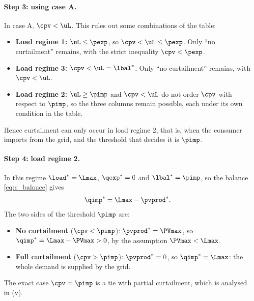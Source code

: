 \paragraph{Step 3: using case A.}
In case A, $\cpv < \uL$. This rules out some combinations of the table:
\begin{itemize}
    \item \textbf{Load regime 1:} $\uL \leq \pexp$, so $\cpv < \uL \leq \pexp$. Only ``no
    curtailment'' remains, with the strict inequality $\cpv < \pexp$.
    \item \textbf{Load regime 3:} $\cpv < \uL = {\lbal}^*$. Only ``no curtailment'' remains,
    with $\cpv < \uL$.
    \item \textbf{Load regime 2:} $\uL \geq \pimp$ and $\cpv < \uL$ do not order $\cpv$ with
    respect to $\pimp$, so the three columns remain possible, each under its own condition
    in the table.
\end{itemize}
Hence curtailment can only occur in load regime 2, that is, when the consumer imports from the
grid, and the threshold that decides it is $\pimp$.

\paragraph{Step 4: load regime 2.}
In this regime ${\load}^* = \Lmax$, ${\qexp}^* = 0$ and ${\lbal}^* = \pimp$, so the balance
\eqref{eq:c_balance} gives
\begin{equation}
    {\qimp}^* = \Lmax - {\pvprod}^*.
\end{equation}
The two sides of the threshold $\pimp$ are:
\begin{itemize}
    \item \textbf{No curtailment} ($\cpv < \pimp$): ${\pvprod}^* = \PVmax$, so
    ${\qimp}^* = \Lmax - \PVmax > 0$, by the assumption $\PVmax < \Lmax$.
    \item \textbf{Full curtailment} ($\cpv > \pimp$): ${\pvprod}^* = 0$, so
    ${\qimp}^* = \Lmax$: the whole demand is supplied by the grid.
\end{itemize}
The exact case $\cpv = \pimp$ is a tie with partial curtailment, which is analysed in (v).


